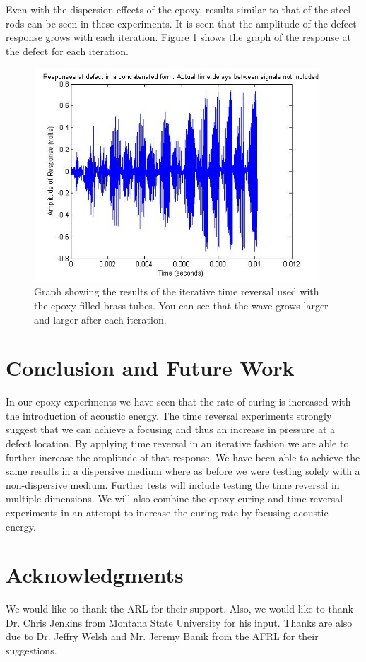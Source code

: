 \documentclass[]{aiaa-tc}%
\begin{document}
Even with the dispersion effects of the epoxy, results similar to that of the steel rods can be seen in these experiments. It is seen that the amplitude of the defect response grows with each iteration. Figure \ref{fig:tr_epoxy1} shows the graph of the response at the defect for each iteration.

\begin{figure}[H]%
\centering
 \includegraphics[height = 8cm]{tr_epoxy_results}
 \caption{Graph showing the results of the iterative time reversal used with the epoxy filled brass tubes. You can see that the wave grows larger and larger after each iteration.}
 \label{fig:tr_epoxy1}
\end{figure}


\section{Conclusion and Future Work}

In our epoxy experiments we have seen that the rate of curing is increased with the introduction of acoustic energy. The time reversal experiments strongly suggest that we can achieve a focusing and thus an increase in pressure at a defect location. By applying time reversal in an iterative fashion we are able to further increase the amplitude of that response. We have been able to achieve the same results in a dispersive medium where as before we were testing solely with a non-dispersive medium. Further tests will include testing the time reversal in multiple dimensions. We will also combine the epoxy curing and time reversal experiments in an attempt to increase the curing rate by focusing acoustic energy.

\section{Acknowledgments}

We would like to thank the ARL for their support. Also, we would like to thank Dr. Chris Jenkins from Montana State University for his input. Thanks are also due to Dr. Jeffry Welsh and Mr. Jeremy Banik from the AFRL for their suggestions.

{}

\end{document}
